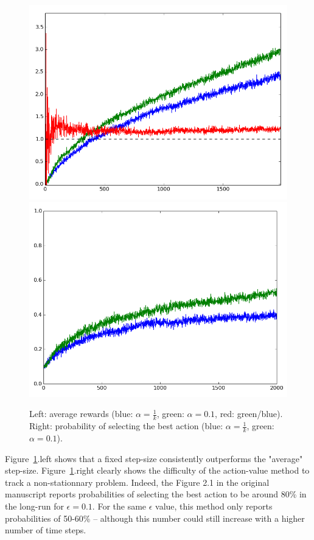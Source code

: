\begin{figure}[!htb]
\centering
\includegraphics[width=0.47\columnwidth]{chap1_bandits/plot_rewards.png}
\includegraphics[width=0.47\columnwidth]{chap1_bandits/plot_bestaction.png}
\caption{\label{chap1_fig_ex24}
Left: average rewards (blue: $\alpha = \frac{1}{k}$, green: $\alpha = 0.1$, red: green/blue).
Right: probability of selecting the best action (blue: $\alpha = \frac{1}{k}$, green: $\alpha = 0.1$).
}
\end{figure}

Figure~\ref{chap1_fig_ex24}.left shows that a fixed step-size consistently outperforms the "average" step-size.
Figure~\ref{chap1_fig_ex24}.right clearly shows the difficulty of the action-value method to track a non-stationnary problem.
Indeed, the Figure 2.1 in the original manuscript reports probabilities of selecting the best action to be around 80\% in the long-run for $\epsilon = 0.1$.
For the same $\epsilon$ value, this method only reports probabilities of 50-60\% -- although this number could still increase with a higher number of time steps.
